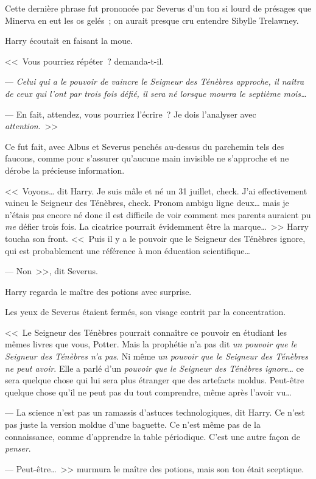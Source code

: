 Cette dernière phrase fut prononcée par Severus d'un ton si lourd de présages que Minerva en eut les os gelés~; on aurait presque cru entendre Sibylle Trelawney.

Harry écoutait en faisant la moue.

<<~Vous pourriez répéter~? demanda-t-il.

--- \emph{Celui qui a le pouvoir de vaincre le Seigneur des Ténèbres approche, il naîtra de ceux qui l'ont par trois fois défié, il sera né lorsque mourra le septième mois…}

--- En fait, attendez, vous pourriez l'écrire~? Je dois l'analyser avec \emph{attention}.~>>

Ce fut fait, avec Albus et Severus penchés au-dessus du parchemin tels des faucons, comme pour s'assurer qu'aucune main invisible ne s'approche et ne dérobe la précieuse information.

<<~Voyons… dit Harry. Je suis mâle et né un 31 juillet, check. J'ai effectivement vaincu le Seigneur des Ténèbres, check. Pronom ambigu ligne deux… mais je n'étais pas encore né donc il est difficile de voir comment mes parents auraient pu \emph{me} défier trois fois. La cicatrice pourrait évidemment être la marque…~>> Harry toucha son front. <<~Puis il y a le pouvoir que le Seigneur des Ténèbres ignore, qui est probablement une référence à mon éducation scientifique…

--- Non~>>, dit Severus.

Harry regarda le maître des potions avec surprise.

Les yeux de Severus étaient fermés, son visage contrit par la concentration.

<<~Le Seigneur des Ténèbres pourrait connaître ce pouvoir en étudiant les mêmes livres que vous, Potter. Mais la prophétie n'a pas dit \emph{un pouvoir que le Seigneur des Ténèbres n'a pas}. Ni même \emph{un pouvoir que le Seigneur des Ténèbres ne peut avoir}. Elle a parlé d'un \emph{pouvoir que le Seigneur des Ténèbres ignore}… ce sera quelque chose qui lui sera plus étranger que des artefacts moldus. Peut-être quelque chose qu'il ne peut pas du tout comprendre, même après l'avoir vu…

--- La science n'est pas un ramassis d'astuces technologiques, dit Harry. Ce n'est pas juste la version moldue d'une baguette. Ce n'est même pas de la connaissance, comme d'apprendre la table périodique. C'est une autre façon de \emph{penser}.

--- Peut-être…~>> murmura le maître des potions, mais son ton était sceptique.

